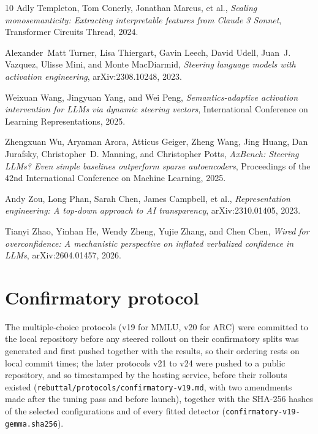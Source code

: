 \documentclass{article}
\begin{document}
\begin{thebibliography}{10}
Adly Templeton, Tom Conerly, Jonathan Marcus, et al., \emph{Scaling
  monosemanticity: Extracting interpretable features from Claude 3 Sonnet},
  Transformer Circuits Thread, 2024.

Alexander~Matt Turner, Lisa Thiergart, Gavin Leech, David Udell, Juan~J.
  Vazquez, Ulisse Mini, and Monte MacDiarmid, \emph{Steering language models
  with activation engineering}, arXiv:2308.10248, 2023.

Weixuan Wang, Jingyuan Yang, and Wei Peng, \emph{Semantics-adaptive activation
  intervention for LLMs via dynamic steering vectors}, International Conference
  on Learning Representations, 2025.

Zhengxuan Wu, Aryaman Arora, Atticus Geiger, Zheng Wang, Jing Huang, Dan
  Jurafsky, Christopher~D. Manning, and Christopher Potts, \emph{AxBench:
  Steering LLMs? Even simple baselines outperform sparse autoencoders},
  Proceedings of the 42nd International Conference on Machine Learning, 2025.

Andy Zou, Long Phan, Sarah Chen, James Campbell, et al., \emph{Representation
  engineering: A top-down approach to AI transparency}, arXiv:2310.01405, 2023.

Tianyi Zhao, Yinhan He, Wendy Zheng, Yujie Zhang, and Chen Chen, \emph{Wired
  for overconfidence: A mechanistic perspective on inflated verbalized
  confidence in LLMs}, arXiv:2604.01457, 2026.

\end{thebibliography}

\appendix

\section{Confirmatory protocol}
\label{app:protocol}

The multiple-choice protocols (v19 for MMLU, v20 for ARC) were committed to
the local repository before any steered rollout on their confirmatory splits
was generated and first pushed together with the results, so their ordering
rests on local commit times; the later protocols v21 to v24 were pushed to a
public repository, and so timestamped by the hosting service, before their
rollouts existed (\texttt{rebuttal/protocols/confirmatory-v19.md},
with two amendments made after the tuning pass and before launch), together
with the SHA-256 hashes of the selected configurations and of every fitted
detector (\texttt{confirmatory-v19-gemma.sha256}).
\end{document}

